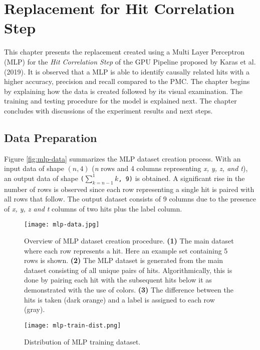 
\chapter{Replacement for Hit Correlation Step} %
\label{cha:mlp}

% 
This chapter presents the replacement created using a Multi Layer
Perceptron (MLP) for the \textit{Hit Correlation Step} of the GPU
Pipeline proposed by Karas et al. (2019). It is observed that a MLP is
able to identify causally related hits with a higher accuracy,
precision and recall compared to the PMC. The chapter begins by
explaining how the data is created followed by its visual examination.
The training and testing procedure for the model is explained next.
The chapter concludes with discussions of the experiment results and
next steps.

\section{Data Preparation}
\label{sec:mlp-data-prep}

Figure \ref{fig:mlp-data} summarizes the MLP dataset creation process.
With an input data of shape $(n, 4)$ (\emph{n} rows and 4 columns
representing \emph{x, y, z, and t}), an output data of shape
\texttt{($\sum_{k=n-1}^{1}k$, 9)} is obtained. A significant rise in
the number of rows is observed since each row representing a single
hit is paired with all rows that follow. The output dataset consists
of 9 columns due to the presence of \emph{x, y, z and t} columns of
two hits plus the label column.

\begin{figure}[htb]
  \centering
  \begin{minipage}[t]{0.74\textwidth}
    \texttt{[image: mlp-data.jpg]}
    \caption{Overview of MLP dataset creation procedure. \textbf{(1)}
      The main dataset where each row represents a hit. Here an
      example set containing 5 rows is shown. \textbf{(2)} The MLP
      dataset is generated from the main dataset consisting of all
      unique pairs of hits. Algorithmically, this is done by pairing
      each hit with the subsequent hits below it as demonstrated with
      the use of colors. \textbf{(3)} The difference between the hits
      is taken (dark orange) and a label is assigned to each row
      (gray).}
    \label{fig:mlp-data}
  \end{minipage}
  \begin{minipage}[t]{0.24\textwidth}
    \centering
    \texttt{[image: mlp-train-dist.png]}
    \caption{Distribution of MLP training dataset.}
    \label{fig:mlp-train-dist}
  \end{minipage}
\end{figure}

